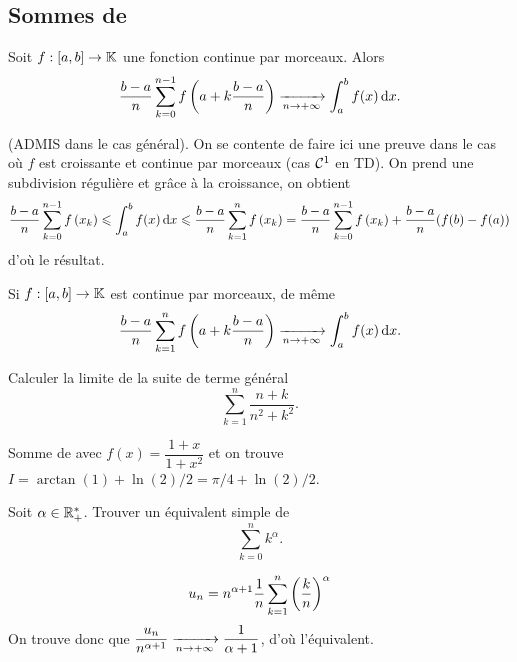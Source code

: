 \documentclass{magnolia}
\begin{document}



\subsection{Sommes de }

\begin{proposition}[utile=3]
Soit $f:[a,b]\to\mathbb{K}$ une fonction continue par morceaux.  Alors
\[\frac{b-a}{n}\sum_{k=0}^{n-1} f\left(a+k\frac{b-a}{n}\right)
  \xrightarrow[n\rightarrow +\infty]{} \int_{a}^{b} f(x)\,\text{d}x.\]
\end{proposition}

\begin{preuve}
(ADMIS dans le cas général). On se contente de faire ici une preuve dans le cas où $f$ est croissante et continue par morceaux (cas $\mathcal{C}^{1}$ en TD). On prend une subdivision régulière et grâce à la croissance, on obtient $$\frac{b-a}{n}\sum_{k=0}^{n-1} f\left(x_k\right)\leqslant \int_{a}^{b} f(x)\,\text{d}x\leqslant \frac{b-a}{n}\sum_{k=1}^{n} f\left(x_k\right)=\frac{b-a}{n}\sum_{k=0}^{n-1} f\left(x_k\right)+\frac{b-a}{n}(f(b)-f(a))$$ d'où le résultat.
\end{preuve}

\begin{remarqueUnique}
\remarque[utile=-3] Si $f:[a,b]\to\mathbb{K}$ est continue par morceaux, de même
  \[\frac{b-a}{n}\sum_{k=1}^n f\left(a+k\frac{b-a}{n}\right)
    \xrightarrow[n\rightarrow +\infty]{} \int_{a}^{b} f(x)\,\text{d}x.\]
\end{remarqueUnique}

\begin{exos}
\exo[utile=3] Calculer la limite de la suite de terme général
  \[\sum_{k=1}^n \frac{n+k}{n^2+k^2}.\]
  \begin{sol}
  Somme de  avec $f(x)=\dfrac{1+x}{1+x^2}$ et on trouve $I=\arctan(1)+\ln(2)/2=\pi/4+\ln(2)/2$.
  \end{sol}
\exo[utile=3] Soit $\alpha\in\mathbb{R}_+^*$. Trouver un équivalent simple de
  \[\sum_{k=0}^n k^\alpha.\]
  \begin{sol}
  $$u_n=n^{\alpha+1}\frac{1}{n}\sum_{k=1}^n\left(\frac{k}{n}\right)^\alpha$$
  On trouve donc que $\dfrac{u_n}{n^{\alpha+1}}\xrightarrow[n\rightarrow +\infty]{}\dfrac{1}{\alpha+1}$, d'où l'équivalent.
  \end{sol}
\end{exos}
\end{document}

